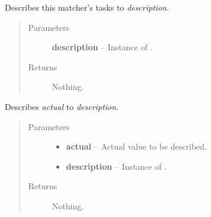 \documentclass[letterpaper,10pt,english]{sphinxmanual}
\begin{document}

\begin{fulllineitems}
\label{modules/jshamcrest:JsHamcrest.SimpleMatcher.describeTo}
Describes this matcher's tasks to \emph{description}.
\begin{quote}\begin{description}
\item[{Parameters}] \leavevmode
\textbf{description} -- Instance of {\hyperref[modules/jshamcrest:JsHamcrest.Description]{}}.

\item[{Returns}] \leavevmode
Nothing.

\end{description}\end{quote}

\end{fulllineitems}


\begin{fulllineitems}
\label{modules/jshamcrest:JsHamcrest.SimpleMatcher.describeValueTo}
Describes \emph{actual} to \emph{description}.
\begin{quote}\begin{description}
\item[{Parameters}] \leavevmode\begin{itemize}
\item {} 
\textbf{actual} -- Actual value to be described.

\item {} 
\textbf{description} -- Instance of {\hyperref[modules/jshamcrest:JsHamcrest.Description]{}}.

\end{itemize}

\item[{Returns}] \leavevmode
Nothing.

\end{description}\end{quote}

\end{fulllineitems}

\end{document}
